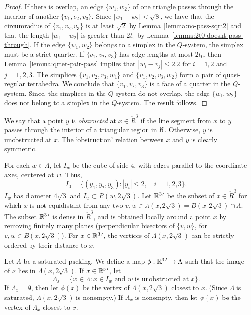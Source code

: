 \begin{proof} If there is overlap, an edge $\{w_1,w_2\}$ of one triangle passes
through the interior of another $\{v_1,v_2,v_3\}$.  Since
$|w_1-w_2|<\sqrt8$,  we have that the circumradius of
$\{v_1,v_2,v_3\}$ is at least $\sqrt2$ by
Lemma~\ref{lemma:no-pass-sqrt2} and that the length $|w_1-w_2|$ is
greater than $2t_0$ by Lemma~\ref{lemma:2t0-doesnt-pass-through}.
If the edge $\{w_1,w_2\}$ belongs to a simplex in the $Q$-system,
the simplex must be a strict quarter.  If $\{v_1,v_2,v_3\}$ has
edge lengths at most $2t_0$, then
Lemma~\ref{lemma:qrtet-pair-pass} implies that $|w_i-v_j|\le2.2$
for $i=1,2$ and $j=1,2,3$.   The simplices $\{v_1,v_2,v_3,w_1\}$
and $\{v_1,v_2,v_3,w_2\}$ form a pair of quasi-regular tetrahedra.
We conclude that $\{v_1,v_2,v_3\}$ is a face of a quarter in the
$Q$-system. Since, the simplices in the $Q$-system do not overlap,
the edge $\{w_1,w_2\}$ does not belong to a simplex in the
$Q$-system. The result follows.
\end{proof}




\begin{definition} \label{def:obstructed}
We say that a point $y$ is {\it obstructed\/} at $x\in\ring{R}^3$
if the line segment from $x$ to $y$ passes through the interior of
a triangular region in ${\mathcal B}$. Otherwise, $y$ is unobstructed at
$x$.  The `obstruction' relation between $x$ and $y$ is clearly
symmetric.
\end{definition}

For each $w\in\Lambda$, let $I_w$ be the cube of side $4$, with
edges parallel to the coordinate axes, centered at $w$.  Thus,
   $$I_0 = \{(y_1,y_2,y_3) :  |y_i|\le 2,\quad i=1,2,3\}.$$
$I_w$ has diameter $4\sqrt3$ and $I_w\subset B(w,2\sqrt3)$.  Let
$\mathbb{R}^{3\,\prime}$ be the subset of $x\in\ring{R}^3$ for which $x$ is not
equidistant from any two $v,w\in \Lambda(x,2\sqrt3)=
B(x,2\sqrt3)\cap\Lambda$. The subset $\mathbb{R}^{3\,\prime}$ is dense in
$\ring{R}^3$, and is obtained locally around a point $x$ by
removing finitely many planes (perpendicular bisectors of
$\{v,w\}$, for $v,w\in B(x,2\sqrt3)$). For $x\in\mathbb{R}^{3\,\prime}$, the vertices
of $\Lambda(x,2\sqrt3)$ can be strictly ordered by their distance
to $x$.

\begin{definition}\label{def:phi}
Let $\Lambda$ be a saturated packing. We define a map
$\phi:\mathbb{R}^{3\,\prime}\to\Lambda$ such that the image of $x$ lies in
$\Lambda(x,2\sqrt3)$.   If $x\in \mathbb{R}^{3\,\prime}$, let
   $$\Lambda_x = \{w\in\Lambda : x \in I_w \text{ and
      $w$ is unobstructed at $x$}\}.$$
If $\Lambda_x = \emptyset$, then let $\phi(x)$ be the vertex of
$\Lambda(x,2\sqrt3)$ closest to $x$.   (Since $\Lambda$ is
saturated, $\Lambda(x,2\sqrt3)$ is nonempty.)  If $\Lambda_x$ is
nonempty, then let $\phi(x)$ be the vertex of $\Lambda_x$ closest to
$x$.
\end{definition}

